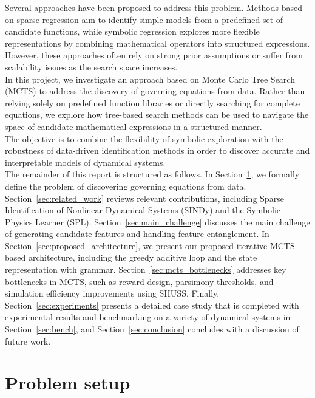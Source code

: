 \documentclass[11pt, a4paper]{article}
\begin{document}
Several approaches have been proposed to address this problem. Methods based on sparse regression aim to identify simple models from a predefined set of candidate functions, while symbolic regression explores more flexible representations by combining mathematical operators into structured expressions. However, these approaches often rely on strong prior assumptions or suffer from scalability issues as the search space increases.\\

In this project, we investigate an approach based on Monte Carlo Tree Search (MCTS) to address the discovery of governing equations from data. Rather than relying solely on predefined function libraries or directly searching for complete equations, we explore how tree-based search methods can be used to navigate the space of candidate mathematical expressions in a structured manner.\\

The objective is to combine the flexibility of symbolic exploration with the robustness of data-driven identification methods in order to discover accurate and interpretable models of dynamical systems.\\

The remainder of this report is structured as follows. In Section~\ref{sec:problem_setup}, we formally define the problem of discovering governing equations from data. Section~\ref{sec:related_work} reviews relevant contributions, including Sparse Identification of Nonlinear Dynamical Systems (SINDy) and the Symbolic Physics Learner (SPL). Section~\ref{sec:main_challenge} discusses the main challenge of generating candidate features and handling feature entanglement. In Section~\ref{sec:proposed_architecture}, we present our proposed iterative MCTS-based architecture, including the greedy additive loop and the state representation with grammar. Section~\ref{sec:mcts_bottlenecks} addresses key bottlenecks in MCTS, such as reward design, parsimony thresholds, and simulation efficiency improvements using SHUSS. Finally, Section~\ref{sec:experiments} presents a detailed case study that is completed with experimental results and benchmarking on a variety of dynamical systems in Section~\ref{sec:bench}, and Section~\ref{sec:conclusion} concludes with a discussion of future work.

\section{Problem setup}
\label{sec:problem_setup}
\end{document}
